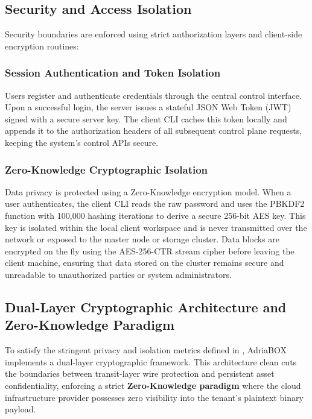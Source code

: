 \subsection{Security and Access Isolation}
Security boundaries are enforced using strict authorization layers and client-side encryption routines:

\subsubsection{Session Authentication and Token Isolation}
Users register and authenticate credentials through the central control interface. Upon a successful login, the server issues a stateful JSON Web Token (JWT) signed with a secure server key. The client CLI caches this token locally and appends it to the authorization headers of all subsequent control plane requests, keeping the system's control APIs secure.

\subsubsection{Zero-Knowledge Cryptographic Isolation}
Data privacy is protected using a Zero-Knowledge encryption model. When a user authenticates, the client CLI reads the raw password and uses the PBKDF2 function with 100,000 hashing iterations to derive a secure 256-bit AES key. This key is isolated within the local client workspace and is never transmitted over the network or exposed to the master node or storage cluster. Data blocks are encrypted on the fly using the AES-256-CTR stream cipher before leaving the client machine, ensuring that data stored on the cluster remains secure and unreadable to unauthorized parties or system administrators.

\subsection{Dual-Layer Cryptographic Architecture and Zero-Knowledge Paradigm}
\label{sub:crypto_architecture}

To satisfy the stringent privacy and isolation metrics defined in , AdriaBOX implements a dual-layer cryptographic framework. This architecture clean cuts the boundaries between transit-layer wire protection and persistent asset confidentiality, enforcing a strict \textbf{Zero-Knowledge paradigm} where the cloud infrastructure provider possesses zero visibility into the tenant's plaintext binary payload.

